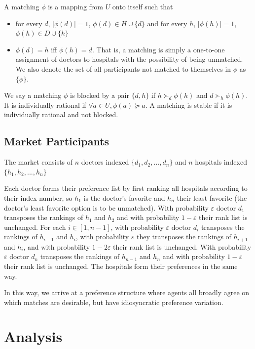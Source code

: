 \documentclass[WP]{AEA}
\begin{document}
A matching $\phi$ is a mapping from $U$ onto itself such that 
\begin{itemize}
	\item for every $d$, $|\phi(d)| = 1$, $\phi(d) \in H \cup \{d\} $ and for every  $h$, $|\phi(h)| = 1$, $\phi(h) \in D \cup \{h\}$
	\item $\phi(d) = h$ iff $\phi(h) = d$.  That is, a matching is simply a one-to-one assignment of doctors to hospitals with the possibility of being unmatched. We also denote the set of all participants not matched to themselves in $\phi$ as $\{\phi\}$.
\end{itemize}
We say a matching $\phi$ is blocked by a pair $\{d,h\}$ if $h \succ_d \phi(h)$ and $d \succ_h \phi(h)$. It is individually rational if $\forall a \in U ,\phi(a) \succeq a$. A matching is stable if it is individually rational and not blocked.

\subsection{Market Participants}

The market consists of $n$ doctors  indexed $\{ d_1, d_2, ... ,d_n\}$ and  $n$ hospitals  indexed $\{ h_1, h_2, ... ,h_n\}$
	
Each doctor forms their preference list by first ranking all hospitals according to their index number, so $h_1$ is the doctor's favorite and $h_n$ their least favorite (the doctor's least favorite option is to be unmatched).  
With probability $\varepsilon$ doctor $d_1$ transposes the rankings of $h_{1}$ and $h_2$ and with probability $1-\varepsilon$ their rank list is unchanged.  For each $i  \in [1, n-1]$, with probability $\varepsilon$ doctor $d_i$ transposes the rankings of $h_{i-1}$ and $h_i$, with probability $\varepsilon$ they transposes the rankings of $h_{i+1}$ and $h_i$, and with probability $1-2\varepsilon$ their rank list is unchanged. With probability $\varepsilon$ doctor $d_n$ transposes the rankings of $h_{n-1}$ and $h_n$ and with probability $1-\varepsilon$ their rank list is unchanged.
The hospitals form their preferences in the same way.

In this way, we arrive at a preference structure where agents all broadly agree on which matches are desirable, but have idiosyncratic preference variation.
	


	
\section{Analysis}
\end{document}
